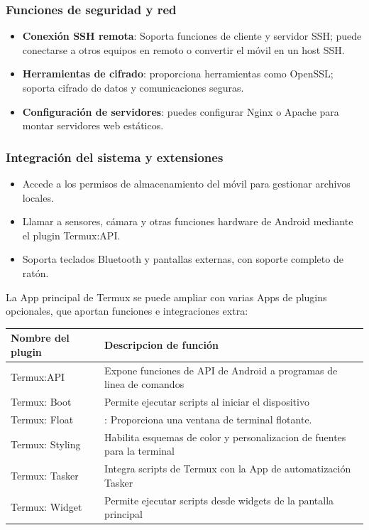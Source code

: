 \subsubsection*{Funciones de seguridad y red}

\begin{itemize}
  \item \textbf{Conexión SSH remota}: Soporta funciones de cliente y servidor SSH; puede conectarse a otros equipos en remoto o convertir el móvil en un host SSH.
  \item \textbf{Herramientas de cifrado}: proporciona herramientas como OpenSSL; soporta cifrado de datos y comunicaciones seguras.
  \item \textbf{Configuración de servidores}: puedes configurar Nginx o Apache para montar servidores web estáticos.
\end{itemize}

\subsubsection*{Integración del sistema y extensiones}

\begin{itemize}
  \item Accede a los permisos de almacenamiento del móvil para gestionar archivos locales.
  \item Llamar a sensores, cámara y otras funciones hardware de Android mediante el plugin Termux:API.
  \item Soporta teclados Bluetooth y pantallas externas, con soporte completo de ratón.
\end{itemize}


La App principal de Termux se puede ampliar con varias Apps de plugins opcionales, que aportan funciones e integraciones extra:

\begin{center}
\begin{tabularx}{\linewidth}{|X|X|}
\hline
\textbf{Nombre del plugin} & \textbf{Descripcion de función} \tabularnewline
\hline
Termux:API & Expone funciones de API de Android a programas de linea de comandos \tabularnewline
Termux: Boot & Permite ejecutar scripts al iniciar el dispositivo \tabularnewline
Termux: Float & : Proporciona una ventana de terminal flotante. \tabularnewline
Termux: Styling & Habilita esquemas de color y personalizacion de fuentes para la terminal \tabularnewline
Termux: Tasker & Integra scripts de Termux con la App de automatización Tasker \tabularnewline
Termux: Widget & Permite ejecutar scripts desde widgets de la pantalla principal \tabularnewline
\hline
\end{tabularx}
\end{center}


